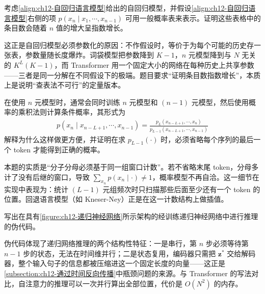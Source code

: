 \documentclass[../../main.tex]{subfiles}
\begin{document}
\begin{exercise}[（$\star$）]\label{exercise:ch12-12}
考虑\eqref{align:ch12-自回归语言模型}给出的自回归模型，并假设\eqref{align:ch12-自回归语言模型}右侧的项 $p\left(x_n\mid x_1,\cdots,x_{n-1}\right)$ 可用一般概率表来表示。证明这些表格中的条目数会随着 $n$ 值的增大呈指数增长。
\end{exercise}

\begin{remark}
这正是自回归模型必须参数化的原因：不作假设时，等价于为每个可能的历史存一张表，参数量随长度爆炸。词袋模型把参数降到 $K-1$，$n$ 元模型降到与 $N$ 无关的 $K^{L}(K-1)$，而 Transformer 用一个固定大小的网络在每种历史上共享参数——三者是同一分解在不同假设下的极端。题目要求“证明条目数指数增长”，本质上是说明“查表法不可行”的定量版本。
\end{remark}

\begin{exercise}[（$\star$）]\label{exercise:ch12-13}
在使用 $n$ 元模型时，通常会同时训练 $n$ 元模型和 $(n-1)$ 元模型，然后使用概率的乘积法则计算条件概率，其形式为
\begin{align}
p\left(x_n\mid x_{n-L+1},\cdots,x_{n-1}\right)=\frac{p_{L}\left(x_{n-L+1},\cdots,x_{n}\right)}{p_{L-1}\left(x_{n-L+1},\cdots,x_{n-1}\right)}
\label{align:ch12-元模型比值}
\end{align}
解释为什么这样做更方便，并证明在求 $p_{L-1}(\cdot)$ 时，必须省略每个序列的最后一个 token 才能得到正确的概率。
\end{exercise}

\begin{remark}
本题的实质是“分子分母必须基于同一组窗口计数”。若不省略末尾 token，分母多计了没有后继的窗口，导致 $\sum_{x_n}p(x_n\mid\cdot)\neq1$，概率模型不再自洽。这一细节在实现中表现为：统计 $(L-1)$ 元组频次时只扫描那些后面至少还有一个 token 的位置。回退语言模型（如 Kneser-Ney）正是在这一计数结构上做插值。
\end{remark}

\begin{exercise}\label{exercise:ch12-14}
写出在具有\cref{figure:ch12-递归神经网络}所示架构的经训练递归神经网络中进行推理的伪代码。
\end{exercise}

\begin{remark}
伪代码体现了递归网络推理的两个结构性特征：一是串行，第 $n$ 步必须等待第 $n-1$ 步的状态，无法在时间维并行；二是状态复用，编码器只需把 $\mathbf{z}^{*}$ 交给解码器，整个输入句子的信息都被压缩进这一个固定长度的向量——这正是\cref{subsection:ch12-通过时间反向传播}中瓶颈问题的来源。与 Transformer 的写法对比，自注意力的推理可以一次并行算出全部位置，代价是 $O(N^{2})$ 的内存。
\end{remark}
\end{document}
